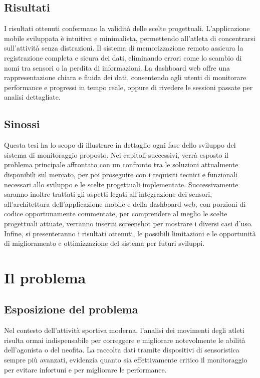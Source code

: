 \documentclass[target=bach,aauheader=,style=]{thud}
\begin{document}
\section{Risultati}
I risultati ottenuti confermano la validità delle scelte progettuali. L'applicazione mobile sviluppata è intuitiva e minimalista, permettendo all’atleta di concentrarsi sull’attività senza distrazioni. Il sistema di memorizzazione remoto assicura la registrazione completa e sicura dei dati, eliminando errori come lo scambio di nomi tra sensori o la perdita di informazioni. La dashboard web offre una rappresentazione chiara e fluida dei dati, consentendo agli utenti di monitorare performance e progressi in tempo reale, oppure di rivedere le sessioni passate per analisi dettagliate.
\section{Sinossi}
Questa tesi ha lo scopo di illustrare in dettaglio ogni fase dello sviluppo del sistema di monitoraggio proposto. Nei capitoli successivi, verrà esposto il problema principale affrontato con un confronto tra le soluzioni attualmente disponibili sul mercato, per poi proseguire con i requisiti tecnici e funzionali necessari allo sviluppo e le scelte progettuali implementate. Successivamente saranno inoltre trattati gli aspetti legati all’integrazione dei sensori, all’architettura dell’applicazione mobile e della dashboard web, con porzioni di codice opportunamente commentate, per comprendere al meglio le scelte progettuali attuate, verranno inseriti screenshot per mostrare i diversi casi d’uso. Infine, si presenteranno i risultati ottenuti, le possibili limitazioni e le opportunità di miglioramento e ottimizzazione del sistema per futuri sviluppi.
\chapter{Il problema}
\section{Esposizione del problema}
Nel contesto dell'attività sportiva moderna, l'analisi dei movimenti degli atleti risulta ormai indispensabile per correggere e migliorare notevolmente le abilità dell'agonista o del neofita. La raccolta dati tramite dispositivi di sensoristica sempre più avanzati, evidenzia quanto sia effettivamente critico il monitoraggio per evitare infortuni e per migliorare le performance.
\end{document}
